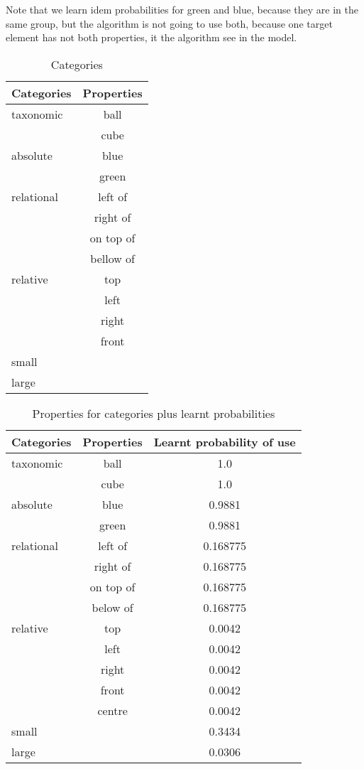 Note that we learn idem probabilities for green and blue, because they are in the same group, but the algorithm is not going to use both, because one target element has not both properties, it the algorithm see in the model.

\begin{table}
\begin{center}
\begin{tabular}{|l|c|}
\hline
Categories & Properties  \\
\hline
taxonomic & ball \\
        	& cube \\
absolute	& blue \\
        	& green \\
relational  & left of\\
   		 & right of\\
   		 & on top of\\
   		 & bellow of\\
relative	& top\\
   		 & left\\
   		 & right\\
   		 & front\\
small   	 &\\
large   	 &\\
\hline
\end{tabular}
\caption{Categories\label{categories}}
\end{center}
\end{table}

\begin{table}
\begin{center}
\begin{tabular}{|l|c|c|}
\hline
Categories & Properties & Learnt probability of use\\
\hline
taxonomic & ball   	&  1.0\\
        	& cube   	&  1.0\\
absolute	& blue   	&  0.9881\\
        	& green  	&  0.9881\\
relational  & left of	&  0.168775\\
   		 & right of   &  0.168775\\
   		 & on top of  &  0.168775\\
   		 & below of  &  0.168775\\
relative	& top    	  &  0.0042\\
   		 & left    	  &  0.0042\\
   		 & right      &  0.0042\\
   		 & front      &  0.0042\\
   		 & centre      &  0.0042\\
small   	 &  		  &  0.3434\\
large   	 &  		  &  0.0306\\
\hline
\end{tabular}
\caption{Properties for categories plus learnt probabilities\label{categories-probabilities}}
\end{center}
\end{table}



